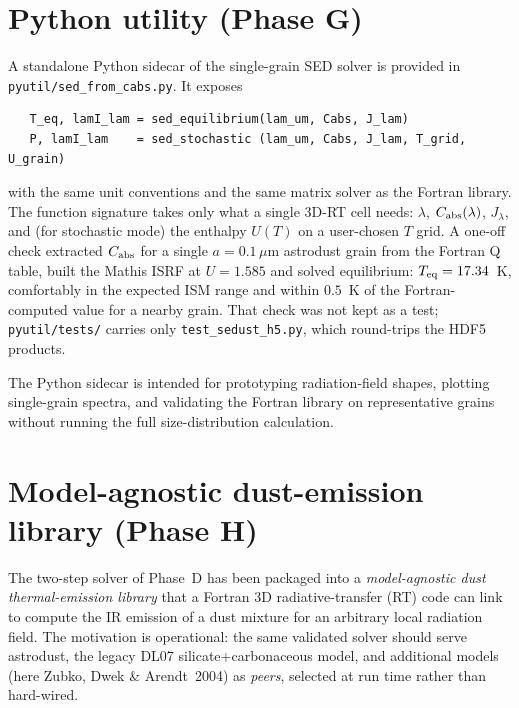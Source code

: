 \documentclass{my_memo}
\newcommand{\Cabs}{\ensuremath{C_{\rm abs}}}
\newcommand{\Teq}{\ensuremath{T_{\rm eq}}}
\begin{document}
\section{Python utility (Phase G)}

A standalone Python sidecar of the single-grain SED solver is provided in
\texttt{pyutil/sed\_from\_cabs.py}. It exposes
\begin{verbatim}
   T_eq, lamI_lam = sed_equilibrium(lam_um, Cabs, J_lam)
   P, lamI_lam    = sed_stochastic (lam_um, Cabs, J_lam, T_grid, U_grain)
\end{verbatim}
with the same unit conventions and the same matrix solver as the
Fortran library. The function signature takes only what a single
3D-RT cell needs: $\lambda$, $C_{\rm abs}(\lambda)$, $J_\lambda$, and
(for stochastic mode) the enthalpy $U(T)$ on a user-chosen $T$ grid.
A one-off check extracted $\Cabs$ for a single
$a = 0.1$\,$\mu$m astrodust grain from the Fortran Q table, built the
Mathis ISRF at $U = 1.585$ and solved equilibrium: $\Teq = 17.34$~K,
comfortably in the expected ISM range and within $0.5$~K of the
Fortran-computed value for a nearby grain. That check was not kept as a
test; \texttt{pyutil/tests/} carries only
\texttt{test\_sedust\_h5.py}, which round-trips the HDF5 products.

The Python sidecar is intended for prototyping radiation-field
shapes, plotting single-grain spectra, and validating the Fortran
library on representative grains without running the full
size-distribution calculation.


\section{Model-agnostic dust-emission library (Phase H)}
\label{sec:phaseH-library}

The two-step solver of Phase~D has been packaged into a
\emph{model-agnostic dust thermal-emission library} that a Fortran 3D
radiative-transfer (RT) code can link to compute the IR emission of a
dust mixture for an arbitrary local radiation field. The motivation is
operational: the same validated solver should serve astrodust, the
legacy DL07 silicate+carbonaceous model, and additional models (here
Zubko, Dwek \& Arendt~2004) as \emph{peers}, selected at run time rather
than hard-wired.
\end{document}

